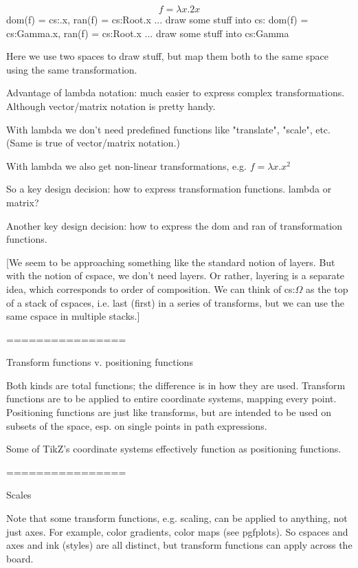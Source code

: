 \documentclass[12pt]{tufte-handout}
\numberwithin{equation}{subsection}
\numberwithin{equation}{subsection}
\begin{document}
  $$f = \lambda x.2x$$
  dom(f) = cs:\Omega.x, ran(f) = cs:Root.x
  ... draw some stuff into cs:\Omega
  dom(f) = cs:Gamma.x, ran(f) = cs:Root.x
  ... draw some stuff into cs:Gamma

  Here we use two spaces to draw stuff, but map them both to the same
  space using the same transformation.

  Advantage of lambda notation: much easier to express complex
  transformations.  Although vector/matrix notation is pretty handy.

  With lambda we don't need predefined functions like "translate",
  "scale", etc.  (Same is true of vector/matrix notation.)

  With lambda we also get non-linear transformations, e.g.
  \(f = \lambda x.x^2\)

  So a key design decision: how to express transformation functions.
  lambda or matrix?

  Another key design decision: how to express the dom and ran of
  transformation functions.

  [We seem to be approaching something like the standard notion of
    layers.  But with the notion of cspace, we don't need layers.  Or
    rather, layering is a separate idea, which corresponds to order of
    composition.  We can think of cs:$\Omega$ as the top of a stack of
    cspaces, i.e. last (first) in a series of transforms, but we can use
    the same cspace in multiple stacks.]

  ================

  Transform functions v. positioning functions

  Both kinds are total functions; the difference is in how they are
  used.  Transform functions are to be applied to entire coordinate
  systems, mapping every point.  Positioning functions are just like
  transforms, but are intended to be used on subsets of the space,
  esp. on single points in path expressions.

  Some of TikZ's coordinate systems effectively function as positioning functions.

  ================

  Scales

  Note that some transform functions, e.g. scaling, can be applied to
  anything, not just axes.  For example, color gradients, color maps
  (see pgfplots).  So cspaces and axes and ink (styles) are all
  distinct, but transform functions can apply across the board.


\end{document}
